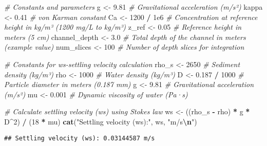 \documentclass[
]{article}
\newenvironment{Shaded}{\begin{snugshade}}{\end{snugshade}}
\newcommand{\CommentTok}[1]{\textcolor[rgb]{0.56,0.35,0.01}{\textit{#1}}}
\newcommand{\DecValTok}[1]{\textcolor[rgb]{0.00,0.00,0.81}{#1}}
\newcommand{\FloatTok}[1]{\textcolor[rgb]{0.00,0.00,0.81}{#1}}
\newcommand{\FunctionTok}[1]{\textcolor[rgb]{0.13,0.29,0.53}{\textbf{#1}}}
\newcommand{\NormalTok}[1]{#1}
\newcommand{\OtherTok}[1]{\textcolor[rgb]{0.56,0.35,0.01}{#1}}
\newcommand{\SpecialCharTok}[1]{\textcolor[rgb]{0.81,0.36,0.00}{\textbf{#1}}}
\newcommand{\StringTok}[1]{\textcolor[rgb]{0.31,0.60,0.02}{#1}}
\begin{document}
\begin{Shaded}
\begin{Highlighting}[]
\CommentTok{\# Constants and parameters}
\NormalTok{g }\OtherTok{\textless{}{-}} \FloatTok{9.81}                  \CommentTok{\# Gravitational acceleration (m/s²)}
\NormalTok{kappa }\OtherTok{\textless{}{-}} \FloatTok{0.41}              \CommentTok{\# von Karman constant}
\NormalTok{Ca }\OtherTok{\textless{}{-}} \DecValTok{1200} \SpecialCharTok{/} \FloatTok{1e6}           \CommentTok{\# Concentration at reference height in kg/m³ (1200 mg/L to kg/m³)}
\NormalTok{z\_ref }\OtherTok{\textless{}{-}} \FloatTok{0.05}              \CommentTok{\# Reference height in meters (5 cm)}
\NormalTok{channel\_depth }\OtherTok{\textless{}{-}} \FloatTok{3.0}       \CommentTok{\# Total depth of the channel in meters (example value)}
\NormalTok{num\_slices }\OtherTok{\textless{}{-}} \DecValTok{100}          \CommentTok{\# Number of depth slices for integration}

\CommentTok{\# Constants for ws{-}settling velocity calculation}
\NormalTok{rho\_s }\OtherTok{\textless{}{-}} \DecValTok{2650}         \CommentTok{\# Sediment density (kg/m³)}
\NormalTok{rho }\OtherTok{\textless{}{-}} \DecValTok{1000}           \CommentTok{\# Water density (kg/m³)}
\NormalTok{D }\OtherTok{\textless{}{-}} \FloatTok{0.187} \SpecialCharTok{/} \DecValTok{1000}     \CommentTok{\# Particle diameter in meters (0.187 mm)}
\NormalTok{g }\OtherTok{\textless{}{-}} \FloatTok{9.81}             \CommentTok{\# Gravitational acceleration (m/s²)}
\NormalTok{mu }\OtherTok{\textless{}{-}} \FloatTok{0.001}           \CommentTok{\# Dynamic viscosity of water (Pa·s)}

\CommentTok{\# Calculate settling velocity (ws) using Stokes\textquotesingle{} law}
\NormalTok{ws }\OtherTok{\textless{}{-}}\NormalTok{ ((rho\_s }\SpecialCharTok{{-}}\NormalTok{ rho) }\SpecialCharTok{*}\NormalTok{ g }\SpecialCharTok{*}\NormalTok{ D}\SpecialCharTok{\^{}}\DecValTok{2}\NormalTok{) }\SpecialCharTok{/}\NormalTok{ (}\DecValTok{18} \SpecialCharTok{*}\NormalTok{ mu)}
\FunctionTok{cat}\NormalTok{(}\StringTok{"Settling velocity (ws):"}\NormalTok{, ws, }\StringTok{"m/s}\SpecialCharTok{\textbackslash{}n}\StringTok{"}\NormalTok{)}
\end{Highlighting}
\end{Shaded}

\begin{verbatim}
## Settling velocity (ws): 0.03144587 m/s
\end{verbatim}
\end{document}
